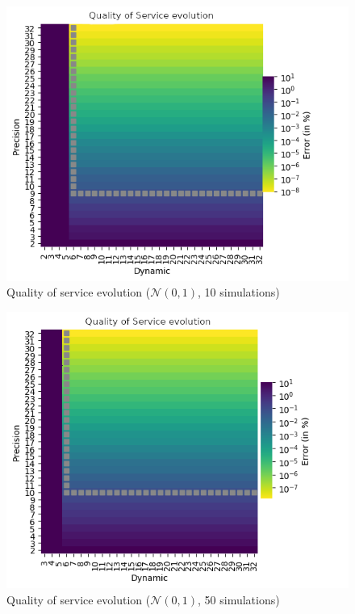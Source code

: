 \begin{figure}
    \centering
    \includegraphics[width=.8\textwidth]{Figures/results/d2-32_p2-32_e8-8_N0-1_s10-0.png}
    \caption{Quality of service evolution ($\mathcal{N}(0, 1)$, 10 simulations)}
    \label{app.quick:fig.qos0-1-10}
\end{figure}
\begin{figure}
    \centering
    \includegraphics[width=.8\textwidth]{Figures/results/d2-32_p2-32_e8-8_N0-1_s50-0.png}
    \caption{Quality of service evolution ($\mathcal{N}(0, 1)$, 50 simulations)}
    \label{app.quick:fig.qos0-1-50}
\end{figure}
